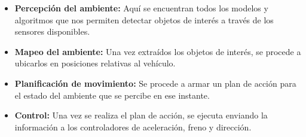     \begin{itemize}[nosep]
        \item \textbf{Percepción del ambiente:} Aquí se encuentran todos los modelos y algoritmos que nos permiten detectar objetos de interés a través de los sensores disponibles.
        \item \textbf{Mapeo del ambiente:} Una vez extraídos los objetos de interés, se procede a ubicarlos en posiciones relativas al vehículo.
        \item \textbf{Planificación de movimiento:} Se procede a armar un plan de acción para el estado del ambiente que se percibe en ese instante.
        \item \textbf{Control:} Una vez se realiza el plan de acción, se ejecuta enviando la información a los controladores de aceleración, freno y dirección.
    \end{itemize}
